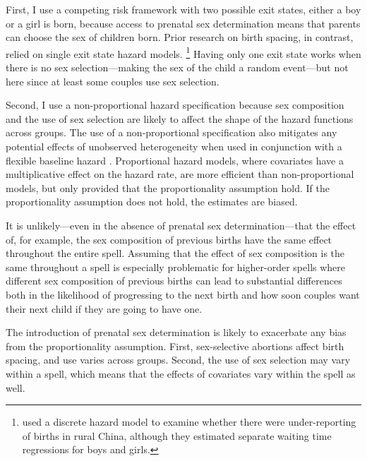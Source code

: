 \documentclass[12pt,letterpaper]{article}
\begin{document}
First, I use a competing risk framework with two possible exit states, either a boy
or a girl is born, because access to prenatal sex determination means that
parents can choose the sex of children born.
Prior research on birth spacing, in contrast, relied on single
exit state hazard models.%
\footnote{
\cite{Merli2000} used a discrete hazard model to examine whether 
there were under-reporting of births in rural China, although they 
estimated separate waiting time regressions for boys and girls.
}
Having only one exit state works when there is no sex selection---making the 
sex of the child a random event---but not here since at least some couples use 
sex selection.

Second, I use a non-proportional hazard specification because
sex composition and the use of sex selection are likely to affect 
the shape of the hazard functions across groups.
The use of a non-proportional specification also mitigates any potential 
effects of unobserved heterogeneity when used in conjunction with a 
flexible baseline hazard \citep{Dolton1995}.
Proportional hazard models, where covariates have a multiplicative 
effect on the hazard rate, are more efficient than non-proportional 
models, but only provided that the proportionality assumption hold.
If the proportionality assumption does not hold, the estimates
are biased.

It is unlikely---even in the absence of prenatal sex determination---that 
the effect of, for example, the sex composition of previous births have 
the same effect throughout the entire spell.
Assuming that the effect of sex composition is the same throughout a spell
is especially problematic for higher-order spells where different
sex composition of previous births can lead to substantial differences 
both in the likelihood of progressing to the next birth and
how soon couples want their next child if they are going to have one.

The introduction of prenatal sex determination is likely to exacerbate 
any bias from the proportionality assumption.
First, sex-selective abortions affect birth spacing, and use
varies across groups.
Second, the use of sex selection may vary within a spell, which means 
that the effects of covariates vary within the spell as well.
\end{document}
